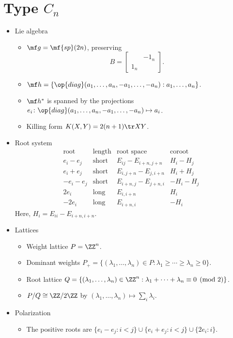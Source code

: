\documentclass{article}
\begin{document}
\newpage
\section{Type \texorpdfstring{$C_n$}{ Cn}}
\begin{itemize}
	\item Lie algebra
	\begin{itemize}
		\item $\mf g=\mf{sp}(2n)$, preserving
		\[B=\begin{bmatrix}
			& -1_n \\ 1_n
		\end{bmatrix}.\]
		\item $\mf h=\{\op{diag}(a_1,\ldots,a_n,-a_1,\ldots,-a_n):a_1,\ldots,a_n\}$.
		\item $\mf h^*$ is spanned by the projections $e_i\colon\op{diag}(a_1,\ldots,a_n,-a_1,\ldots,-a_n)\mapsto a_i$.
		\item Killing form $K(X,Y)=2(n+1)\tr XY$.\todo{}
	\end{itemize}
	\item Root system
	\[\begin{array}{c|cccccc}
		\text{root} & \text{length} & \text{root space} & \text{coroot} \\\hline
		e_i-e_j & \text{short} & E_{ij}-E_{i+n,j+n} & H_i-H_j \\
		e_i+e_j & \text{short} & E_{i,j+n}-E_{j,i+n} & H_i+H_j \\
		-e_i-e_j & \text{short} & E_{i+n,j}-E_{j+n,i} & -H_i-H_j \\
		2e_i & \text{long} & E_{i,i+n} & H_i \\
		-2e_i & \text{long} & E_{i+n,i} & -H_i
	\end{array}\]
	Here, $H_i=E_{ii}-E_{i+n,i+n}$.
	\item Lattices
	\begin{itemize}
		\item Weight lattice $P=\ZZ^n$.
		\item Dominant weights $P_+=\{(\lambda_1,\ldots,\lambda_n)\in P:\lambda_1\ge\cdots\ge\lambda_n\ge0\}$.
		\item Root lattice $Q=\{(\lambda_1,\ldots,\lambda_n)\in\ZZ^n:\lambda_1+\cdots+\lambda_n\equiv0\pmod2\}$.
		\item $P/Q\cong\ZZ/2\ZZ$ by $(\lambda_1,\ldots,\lambda_n)\mapsto\sum_i\lambda_i$.
	\end{itemize}
	\item Polarization
	\begin{itemize}
		\item The positive roots are $\{e_i-e_j:i<j\}\cup\{e_i+e_j:i<j\}\cup\{2e_i:i\}$.

\end{itemize}
\end{itemize}
\end{document}
